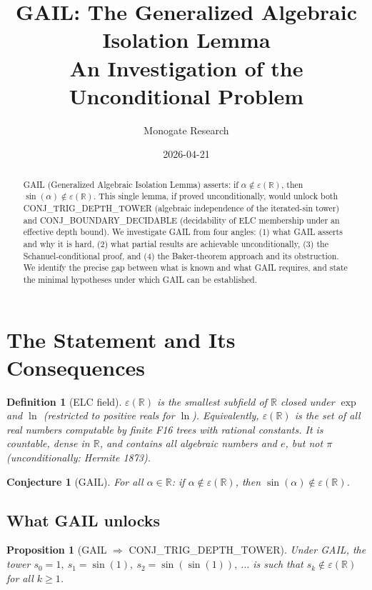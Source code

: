 \documentclass[11pt]{article}
\title{GAIL: The Generalized Algebraic Isolation Lemma\\
An Investigation of the Unconditional Problem}
\author{Monogate Research}
\date{2026-04-21}
\newtheorem{proposition}[theorem]{Proposition}
\newtheorem{definition}[theorem]{Definition}
\newtheorem{conjecture}[theorem]{Conjecture}
\begin{document}
\maketitle

\begin{abstract}
GAIL (Generalized Algebraic Isolation Lemma) asserts: if $\alpha \notin \varepsilon(\mathbb{R})$,
then $\sin(\alpha) \notin \varepsilon(\mathbb{R})$.
This single lemma, if proved unconditionally, would unlock both CONJ\_TRIG\_DEPTH\_TOWER
(algebraic independence of the iterated-sin tower) and CONJ\_BOUNDARY\_DECIDABLE
(decidability of ELC membership under an effective depth bound).
We investigate GAIL from four angles: (1) what GAIL asserts and why it is hard,
(2) what partial results are achievable unconditionally,
(3) the Schanuel-conditional proof,
and (4) the Baker-theorem approach and its obstruction.
We identify the precise gap between what is known and what GAIL requires,
and state the minimal hypotheses under which GAIL can be established.
\end{abstract}

\section{The Statement and Its Consequences}

\begin{definition}[ELC field]
$\varepsilon(\mathbb{R})$ is the smallest subfield of $\mathbb{R}$ closed under
$\exp$ and $\ln$ (restricted to positive reals for $\ln$).
Equivalently, $\varepsilon(\mathbb{R})$ is the set of all real numbers computable
by finite F16 trees with rational constants.
It is countable, dense in $\mathbb{R}$, and contains all algebraic numbers
and $e$, but not $\pi$ (unconditionally: Hermite 1873).
\end{definition}

\begin{conjecture}[GAIL]
\label{conj:gail}
For all $\alpha \in \mathbb{R}$: if $\alpha \notin \varepsilon(\mathbb{R})$,
then $\sin(\alpha) \notin \varepsilon(\mathbb{R})$.
\end{conjecture}

\subsection{What GAIL unlocks}

\begin{proposition}[GAIL $\Rightarrow$ CONJ\_TRIG\_DEPTH\_TOWER]
Under GAIL, the tower $s_0 = 1,\ s_1 = \sin(1),\ s_2 = \sin(\sin(1)),\ \ldots$
is such that $s_k \notin \varepsilon(\mathbb{R})$ for all $k \geq 1$.
\end{proposition}
\end{document}
